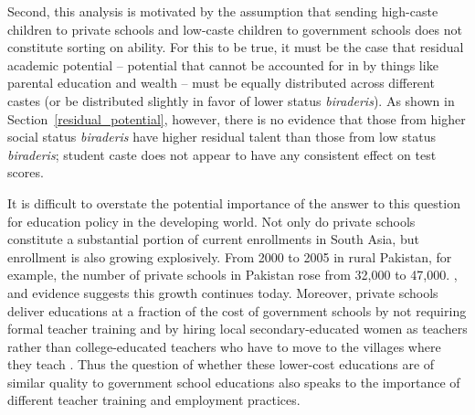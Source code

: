 \documentclass[Eubank_pk_ethnic_sorting.tex]{subfiles}
\begin{document}
Second, this analysis is motivated by the assumption that sending high-caste children to private schools and low-caste children to government schools does not constitute sorting on ability. For this to be true, it must be the case that residual academic potential -- potential that cannot be accounted for in  by things like parental education and wealth -- must be equally distributed across different castes (or be distributed slightly in favor of lower status \emph{biraderis}). As shown in Section~\ref{residual_potential}, however, there is no evidence that those from higher social status \emph{biraderis} have higher residual talent than those from low status \emph{biraderis}; student caste does not appear to have any consistent effect on test scores. 


It is difficult to overstate the potential importance of the answer to this question for education policy in the developing world. Not only do private schools constitute a substantial portion of current enrollments in South Asia, but enrollment is also growing explosively. From 2000 to 2005 in rural Pakistan, for example, the number of private schools in Pakistan rose from 32,000 to 47,000. \citep[p. vi]{Andrabi:2007we}, and evidence suggests this growth continues today. Moreover, private schools deliver educations at a fraction of the cost of government schools by not requiring formal teacher training and by hiring local secondary-educated women as teachers rather than college-educated teachers who have to move to the villages where they teach \citep{Andrabi:2007we}. Thus the question of whether these lower-cost educations are of similar quality to government school educations also speaks to the importance of different teacher training and employment practices.
\end{document}
